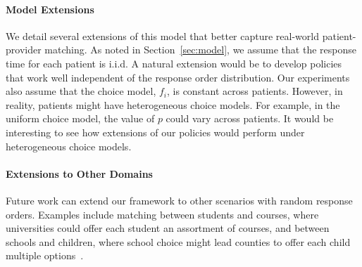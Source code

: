 \paragraph{Model Extensions}
We detail several extensions of this model that better capture real-world patient-provider matching. 
As noted in Section~\ref{sec:model}, we assume that the response time for each patient is i.i.d. 
A natural extension would be to develop policies that work well independent of the response order distribution. 
Our experiments also assume that the choice model, $f_{i}$, is constant across patients. 
However, in reality, patients might have heterogeneous choice models. 
For example, in the uniform choice model, the value of $p$ could vary across patients. 
It would be interesting to see how extensions of our policies would perform under heterogeneous choice models.  

\paragraph{Extensions to Other Domains}
Future work can extend our framework to other scenarios with random response orders. 
Examples include matching between students and courses, where universities could offer each student an assortment of courses, and between schools and children, where school choice might lead counties to offer each child multiple options~\citep{school_choice}. 